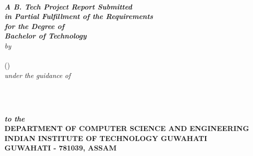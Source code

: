 \begin{titlepage}
\begin{center}
\textheight 15.5in \textwidth 12.5in {\large\sf  \textbf{\the\btptitle}}\\[12ex]
{\small{\textsl{ \textbf{A B. Tech Project Report Submitted \\
in Partial Fulfillment of the Requirements \\
for the Degree of
\\[3ex]\small \bf Bachelor of Technology}}}}\\[16ex] \emph{by} \\[2ex]
{\sf \sf \textbf{\the\name}\\
             (\the\rollno)}\\[1ex]
\emph{under the guidance of}\\[2ex]
{\sf \bf \the\guide} \\[7ex]

\vspace{1.2in}

\begin{figure}[!h]
\hfill
{} \hfill \
\end{figure}

{\sl \bf{to the}} \\[1ex]

{\small\bf DEPARTMENT OF COMPUTER SCIENCE AND ENGINEERING}  \\[1ex]
{\small \bf{INDIAN INSTITUTE OF TECHNOLOGY GUWAHATI \\GUWAHATI - 781039, ASSAM}}
%
\end{center}
\end{titlepage}
